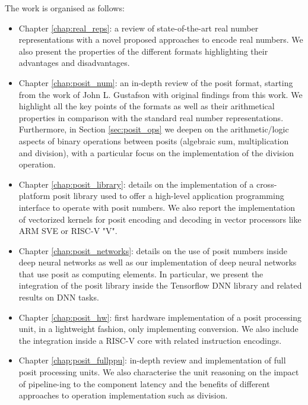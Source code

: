 The work is organised as follows: 
\begin{itemize}
    \item Chapter \ref{chap:real_reps}: a review of state-of-the-art real number representations with a novel proposed approaches to encode real numbers. We also present the properties of the different formats highlighting their advantages and disadvantages. 
    \item Chapter \ref{chap:posit_num}: an in-depth review of the posit format, starting from the work of John L. Gustafson with original findings from this work. We highlight all the key points of the formats as well as their arithmetical properties in comparison with the standard real number representations. Furthermore, in Section \ref{sec:posit_ops} we deepen on the arithmetic/logic aspects of binary operations between posits (algebraic sum, multiplication and division), with a particular focus on the implementation of the division operation.
    \item Chapter \ref{chap:posit_library}: details on the implementation of a cross-platform posit library used to offer a high-level application programming interface to operate with posit numbers. We also report the implementation of vectorized kernels for posit encoding and decoding in vector processors like ARM SVE or RISC-V "V".
    \item Chapter \ref{chap:posit_networks}: details on the use of posit numbers inside deep neural networks as well as our implementation of deep neural networks that use posit as computing elements. In particular, we present the integration of the posit library inside the Tensorflow DNN library and related results on DNN tasks.
    \item Chapter \ref{chap:posit_hw}: first hardware implementation of a posit processing unit, in a lightweight fashion, only implementing conversion. We also include the integration inside a RISC-V core with related instruction encodings.
    \item Chapter \ref{chap:posit_fullppu}: in-depth review and implementation of full posit processing units. We also characterise the unit reasoning on the impact of pipeline-ing to the component latency and the benefits of different approaches to operation implementation such as division.
    
\end{itemize}


